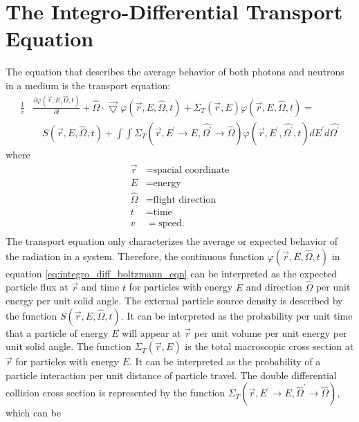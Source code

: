 \section{The Integro-Differential Transport Equation}
\label{sec:int_diff_transport_eqn}
The equation that describes the average behavior of both photons and neutrons
in a medium is the transport equation:
\begin{equation}
  \begin{split}
    \frac{1}{v}&\frac{\partial \varphi(\vec{r},E,\hat{\Omega},t)}{\partial t} +
    \hat{\Omega} \cdot \vec{\bigtriangledown} \varphi(\vec{r},E,\hat{\Omega},t)
    + \Sigma_T(\vec{r},E) \varphi(\vec{r},E,\hat{\Omega},t) = \\
    & \quad S(\vec{r},E,\hat{\Omega},t) +
    \int\int \Sigma_T(\vec{r},E^{'} \to E,\hat{\Omega^{'}} \to \hat{\Omega})
    \varphi(\vec{r},E^{'},\hat{\Omega^{'}},t) dE^{'}d\hat{\Omega^{'}} 
  \end{split}
  \label{eq:integro_diff_boltzmann_eqn}
\end{equation}
where
\begin{align}
  \vec{r} & = \text{spacial coordinate} \nonumber \\
  E & = \text{energy} \nonumber \\
  \hat{\Omega} & = \text{flight direction} \nonumber \\
  t & = \text{time} \nonumber \\
  v & = \text{speed} \nonumber. \\
\end{align} 
The transport equation only characterizes the average or expected behavior of 
the radiation in a system. Therefore, the continuous function
$\varphi(\vec{r},E,\hat{\Omega},t)$ in equation 
\ref{eq:integro_diff_boltzmann_eqn} can be interpreted as the expected particle 
flux at $\vec{r}$ and time $t$ for particles with energy $E$ and direction
$\hat{\Omega}$ per unit energy per unit solid angle. The external particle 
source density is described by the function $S(\vec{r},E,\hat{\Omega},t)$. It 
can be interpreted as the probability per unit time that a particle of energy 
$E$ will appear at $\vec{r}$ per unit volume per unit energy per unit solid 
angle. The function $\Sigma_T(\vec{r},E)$ is the total macroscopic cross 
section at $\vec{r}$ for particles with energy $E$. It can be interpreted as the
probability of a particle interaction per unit distance of particle travel. The 
double differential collision cross section is represented by the function 
$\Sigma_T(\vec{r},E^{'} \to E,\hat{\Omega}^{'} \to \hat{\Omega})$, which can be 
